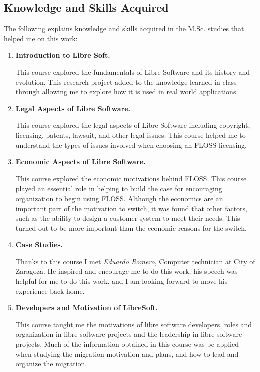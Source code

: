 \subsection{Knowledge and Skills Acquired }
The following explains knowledge and skills acquired in the M.Sc. studies that helped me on
this work:
	\begin{enumerate}[itemsep=0ex]
	
\item \textbf{Introduction to Libre Soft.}

 This course explored the fundamentals of Libre Software and its history and evolution. This research project added to the knowledge learned in class through allowing me to explore how it is used in real world applications.

\item \textbf{Legal Aspects of Libre Software.} 

This course explored the legal aspects of Libre Software including copyright, licensing, patents, lawsuit, and other legal issues. This course helped me to understand the types of issues involved when choosing an FLOSS licensing. 

\item \textbf{Economic Aspects of Libre Software.}

 This course explored the economic motivations behind FLOSS. This course played an essential role in helping to build the case for encouraging organization to begin using FLOSS. Although the economics are an important part of the motivation to switch, it was found that other factors, such as the ability to design a customer system to meet their needs. This turned out to be more important than the economic reasons for the switch. 
 
\item  \textbf{Case Studies.}

Thanks to this course I met \textit{Eduardo Romero}, Computer technician at City of Zaragoza. He inspired and encourage me to do this work, his speech was helpful for me to do this work. and I am looking forward to move his experience back home. 
                 
   \item \textbf{Developers and Motivation of LibreSoft.}
                 
 This course taught me the motivations of libre software developers, roles and organization in libre software projects and the leadership in libre software projects. Much of the information obtained in this course was be applied when studying the migration motivation and plans, and how to lead and organize the migration.
 

\end{enumerate}
